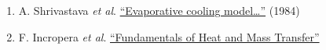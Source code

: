 \documentclass[11pt]{article}
\providecommand{\tightlist}{%
      \setlength{\itemsep}{0pt}\setlength{\parskip}{0pt}}
\begin{document}
\begin{enumerate}
\def\labelenumi{\arabic{enumi}.}
\tightlist
\item
  A. Shrivastava \emph{et al}.
  \href{https://github.com/relaxxpls/CL246-G15/blob/main/docs/papers/Experimental_validation_of_a_thermal_mod.pdf}{``Evaporative
  cooling model\ldots{}''} (1984)
\item
  F. Incropera \emph{et al}.
  \href{https://books.google.co.in/books?id=5cgbAAAAQBAJ\&newbks=0\&hl=en\&source=newbks_fb\&redir_esc=y}{``Fundamentals
  of Heat and Mass Transfer''}
\end{enumerate}


    
    
    
\end{document}
